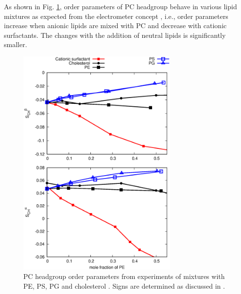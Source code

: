 \documentclass[aps,prl,superscriptaddress,twocolumn]{revtex4}
\begin{document}
As shown in Fig. \ref{HGorderparametersPCvsPEPSPGchol}, order parameters of PC
headgroup behave in various lipid mixtures as expected from the electrometer concept \cite{seelig87, scherer87},
i.e., order parameters increase when anionic lipids are mixed with PC and decrease with cationic
surfactants. The changes with the addition of neutral lipids is significantly smaller.
\begin{figure}[]
  \centering
  \includegraphics[width=8.0cm]{../Figs/HGorderparametersPCvsPEPSPGchol.eps}
  \caption{\label{HGorderparametersPCvsPEPSPGchol}
    PC headgroup order parameters from experiments of mixtures with
    PE, PS, PG and cholesterol \cite{scherer87,scherer89,ferreira13}.
    Signs are determined as discussed in \cite{botan15,ollila16}.
  }
\end{figure}





\end{document}
